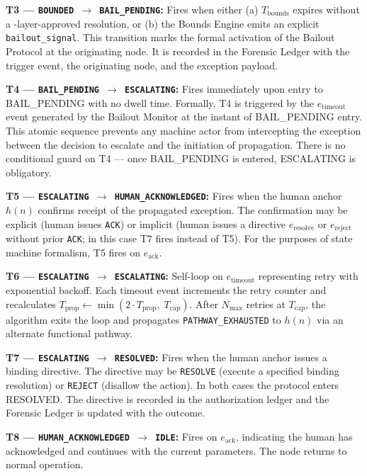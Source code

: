 \bigskip
\noindent\textbf{T3 --- \texttt{BOUNDED $\rightarrow$ BAIL\_PENDING}:} Fires when either (a) $T_{\text{bounds}}$ expires without a \fact-layer-approved resolution, or (b) the Bounds Engine emits an explicit \texttt{bailout\_signal}. This transition marks the formal activation of the Bailout Protocol at the originating node. It is recorded in the Forensic Ledger with the trigger event, the originating node, and the exception payload.

\bigskip
\noindent\textbf{T4 --- \texttt{BAIL\_PENDING $\rightarrow$ ESCALATING}:} Fires immediately upon entry to BAIL\_PENDING with no dwell time. Formally, T4 is triggered by the $e_{\text{timeout}}$ event generated by the Bailout Monitor at the instant of BAIL\_PENDING entry. This atomic sequence prevents any machine actor from intercepting the exception between the decision to escalate and the initiation of propagation. There is no conditional guard on T4 --- once BAIL\_PENDING is entered, ESCALATING is obligatory.

\bigskip
\noindent\textbf{T5 --- \texttt{ESCALATING $\rightarrow$ HUMAN\_ACKNOWLEDGED}:} Fires when the human anchor $h(n)$ confirms receipt of the propagated exception. The confirmation may be explicit (human issues \texttt{ACK}) or implicit (human issues a directive $e_{\text{resolve}}$ or $e_{\text{reject}}$ without prior \texttt{ACK}; in this case T7 fires instead of T5). For the purposes of state machine formalism, T5 fires on $e_{\text{ack}}$.

\bigskip
\noindent\textbf{T6 --- \texttt{ESCALATING $\rightarrow$ ESCALATING}:} Self-loop on $e_{\text{timeout}}$ representing retry with exponential backoff. Each timeout event increments the retry counter and recalculates $T_{\text{prop}} \leftarrow \min(2 \cdot T_{\text{prop}},\; T_{\text{cap}})$. After $N_{\max}$ retries at $T_{\text{cap}}$, the algorithm exits the loop and propagates \texttt{PATHWAY\_EXHAUSTED} to $h(n)$ via an alternate functional pathway.

\bigskip
\noindent\textbf{T7 --- \texttt{ESCALATING $\rightarrow$ RESOLVED}:} Fires when the human anchor issues a binding directive. The directive may be \texttt{RESOLVE} (execute a specified binding resolution) or \texttt{REJECT} (disallow the action). In both cases the protocol enters RESOLVED. The directive is recorded in the authorization ledger and the Forensic Ledger is updated with the outcome.

\bigskip
\noindent\textbf{T8 --- \texttt{HUMAN\_ACKNOWLEDGED $\rightarrow$ IDLE}:} Fires on $e_{\text{ack}}$, indicating the human has acknowledged and continues with the current parameters. The node returns to normal operation.

